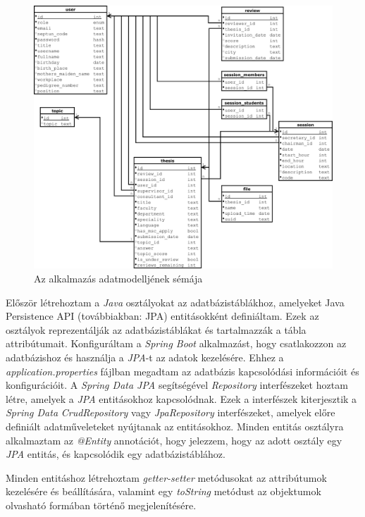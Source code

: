 \begin{figure}[ht]
	\includegraphics[width=\textwidth]{images/Adatmodell.pdf}
	\caption{Az alkalmazás adatmodelljének sémája}
	\label{fig:datamodel}
\end{figure}


Először létrehoztam a \textit{Java} \cite{java} osztályokat az adatbázistáblákhoz, amelyeket Java Persistence API (továbbiakban: JPA) \cite{Java Persistence API} entitásokként definiáltam. Ezek az osztályok reprezentálják az adatbázistáblákat és tartalmazzák a tábla attribútumait. Konfiguráltam a \textit{Spring Boot} \cite{spring_boot} alkalmazást, hogy csatlakozzon az adatbázishoz és használja a \textit{JPA}-t \cite{Java Persistence API} az adatok kezelésére. Ehhez a \textit{application.properties} fájlban megadtam az adatbázis kapcsolódási információit és konfigurációit. A \textit{Spring Data JPA} \cite{Spring Data JPA} segítségével \textit{Repository} interfészeket hoztam létre, amelyek a \textit{JPA} entitásokhoz kapcsolódnak. Ezek a interfészek kiterjesztik a \textit{Spring Data} \textit{CrudRepository} vagy \textit{JpaRepository} interfészeket, amelyek előre definiált adatműveleteket nyújtanak az entitásokhoz. Minden entitás osztályra alkalmaztam az \textit{@Entity} annotációt, hogy jelezzem, hogy az adott osztály egy \textit{JPA} entitás, és kapcsolódik egy adatbázistáblához.


Minden entitáshoz létrehoztam \textit{getter-setter} metódusokat az attribútumok kezelésére és beállítására, valamint egy \textit{toString} metódust az objektumok olvasható formában történő megjelenítésére.

